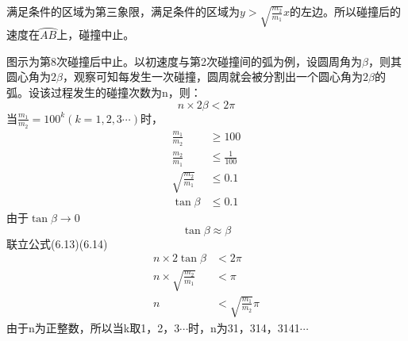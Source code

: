 \begin{problemset}
	满足条件的区域为第三象限，满足条件的区域为$y>\sqrt{\frac{m_2}{m_1}}x$的左边。所以碰撞后的速度在$\wideparen{AB}$上，碰撞中止。

	图示为第8次碰撞后中止。以初速度与第2次碰撞间的弧为例，设圆周角为$\beta$，则其圆心角为$2\beta$，观察可知每发生一次碰撞，圆周就会被分割出一个圆心角为$2\beta$的弧。设该过程发生的碰撞次数为n，则：
	\begin{equation}
		n\times 2\beta<2\pi
	\end{equation}
	当$\frac{m_1}{m_2}=100^k(k=1,2,3\cdots)$时，
	\begin{align*}
		\frac{m_1}{m_2}&\ge 100\\
		\frac{m_2}{m_1}&\le \frac{1}{100}\\
		\sqrt{\frac{m_2}{m_1}}&\le 0.1\\
		\tan\beta&\le 0.1
	\end{align*}
	由于$\tan\beta\rightarrow 0$
	\begin{equation}
		\tan\beta\approx\beta
	\end{equation}
	联立公式(6.13)(6.14)
	\begin{align*}
		n\times 2\tan\beta&<2\pi\\
		n\times \sqrt{\frac{m_2}{m_1}}&<\pi\\
		n&<\sqrt{\frac{m_1}{m_2}}\pi
	\end{align*}
	由于n为正整数，所以当k取1，2，3$\cdots$时，n为31，314，3141$\cdots$
\end{problemset}
